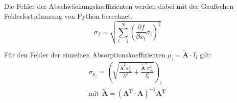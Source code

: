 Die Fehler der Abschwächungskoeffizienten werden dabei mit der Gaußschen Fehlerfortpflanzung von Python berechnet.
\begin{equation}
  \sigma_f = \sqrt{
      \sum\limits_{i = 1}^N
       \left( \frac{\partial f}{\partial x_i} \sigma_i \right)^{\!\! 2}
     }
\end{equation}

Für den Fehler der einzelnen Absorptionskoeffizienten $\mu_{\mathrm{i}}= \symbf{\tilde{A}} \cdot I_{\mathrm{i}}$ gilt:
\begin{align*}
  \sigma_{\mu_i} = \left(\sqrt{\frac{\symbf{\tilde{A}}^2 \sigma_{N}^2}{N^2} + \frac{\symbf{\tilde{A}}^{2} \sigma_{I_{0}}^2}{I_{0}^2}}\right)_i \\
  \text{mit}\:\: \symbf{\tilde{A}} = \left(\symbf{A^T} \cdot \symbf{A}\right)^{-1} \symbf{A^T}
\end{align*}

